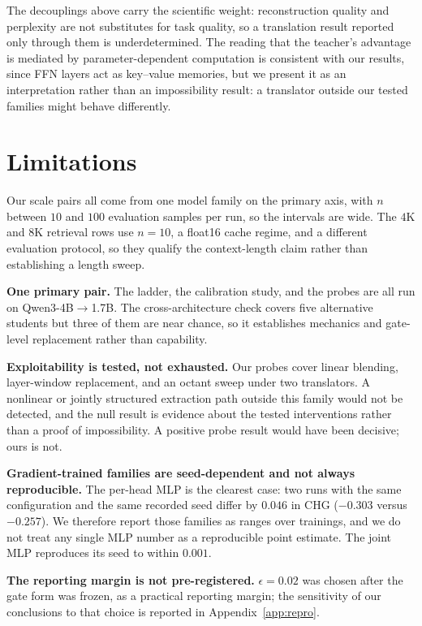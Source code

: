 \documentclass{article} %
\begin{document}
The decouplings above carry the scientific weight: reconstruction quality and
perplexity are not substitutes for task quality, so a translation result
reported only through them is underdetermined. The reading that the teacher's
advantage is mediated by parameter-dependent computation is consistent with our
results, since FFN layers act as key--value memories, but we present it as an
interpretation rather than an impossibility result: a translator outside our
tested families might behave differently.


\section{Limitations}
\label{sec:limitations}

Our scale pairs all come from one model family on the primary axis, with $n$
between $10$ and $100$ evaluation samples per run, so the intervals are wide.
The $4$K and $8$K retrieval rows use
$n{=}10$, a float16 cache regime, and a different evaluation protocol, so they
qualify the context-length claim rather than establishing a length sweep.

\textbf{One primary pair.} The ladder, the calibration study, and the probes are
all run on Qwen3-4B$\to$1.7B. The cross-architecture check covers five
alternative students but three of them are near chance, so it establishes
mechanics and gate-level replacement rather than capability.

\textbf{Exploitability is tested, not exhausted.} Our probes cover linear
blending, layer-window replacement, and an octant sweep under two translators. A
nonlinear or jointly structured extraction path outside this family would not be
detected, and the null result is evidence about the tested interventions rather
than a proof of impossibility. A positive probe result would have been decisive;
ours is not.

\textbf{Gradient-trained families are seed-dependent and not always
reproducible.} The per-head MLP is the clearest case: two runs with the same
configuration and the same recorded seed differ by $0.046$ in CHG
($-0.303$ versus $-0.257$). We therefore report those families as ranges over
trainings, and we do not treat any single MLP number as a reproducible point
estimate. The joint MLP reproduces its seed to within $0.001$.

\textbf{The reporting margin is not pre-registered.} $\epsilon{=}0.02$ was
chosen after the gate form was frozen, as a practical reporting margin; the
sensitivity of our conclusions to that choice is reported in
Appendix~\ref{app:repro}.
\end{document}
